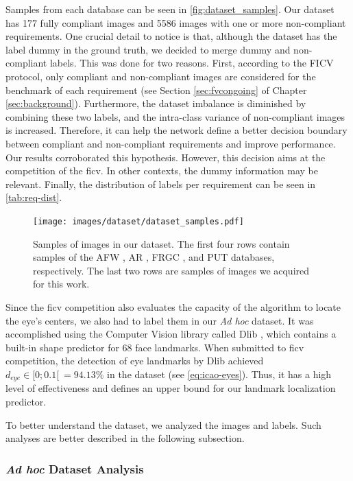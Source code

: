 Samples from each database can be seen in \autoref{fig:dataset_samples}. Our dataset has 177 fully compliant images and 5586 images with one or more non-compliant requirements. One crucial detail to notice is that, although the \adhoc dataset has the label dummy in the ground truth, we decided to merge dummy and non-compliant labels. This was done for two reasons. First, according to the FICV protocol, only compliant and non-compliant images are considered for the benchmark of each requirement (see Section \ref{sec:fvcongoing} of Chapter \ref{sec:background}). Furthermore, the dataset imbalance is diminished by combining these two labels, and the intra-class variance of non-compliant images is increased. Therefore, it can help the network define a better decision boundary between compliant and non-compliant requirements and improve performance. Our results corroborated this hypothesis. However, this decision aims at the competition of the \acs{ficv}. In other contexts, the dummy information may be relevant. Finally, the distribution of labels per requirement can be seen in \autoref{tab:req-dist}. 
 
\begin{figure}[tb]
\centering
\texttt{[image: images/dataset/dataset\_samples.pdf]}
\caption{Samples of images in our dataset. The first four rows contain samples of the AFW \citep{databaseAFW}, AR \citep{martinez1998ar}, FRGC \citep{databaseFRGC}, and PUT \citep{kasinski2008put} databases, respectively. The last two rows are samples of images we acquired for this work.}
\label{fig:dataset_samples}
\end{figure}
 

 
Since the \acs{ficv} competition also evaluates the capacity of the algorithm to locate the eye's centers, we also had to label them in our \textit{Ad hoc} dataset. It was accomplished using the Computer Vision library called Dlib \citep{dlib}, which contains a built-in shape predictor for 68 face landmarks. When submitted to \acs{ficv} competition, the detection of eye landmarks by Dlib achieved $d_{eye} \in [0;0.1[\ = 94.13\%$ in the \ficvtest dataset (see \autoref{eq:icao-eyes}). Thus, it has a high level of effectiveness and defines an upper bound for our landmark localization predictor.
 
To better understand the \adhoc dataset, we analyzed the images and labels. Such analyses are better described in the following subsection.
 
\subsubsection{\textit{Ad hoc} Dataset Analysis}
 
